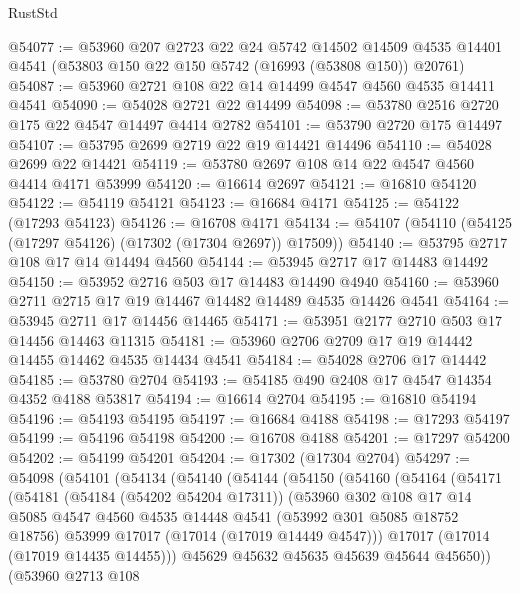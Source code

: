 \begin{lexlean}{RustStd}
\begin{coremodule}
{\begin{coremodule}
{{{{{{{{{{{{{{{{{{{{{{{{{{{{{{{{{{{{{{{{{{{{{{{{{{{{{{{@54077 := @53960
    @207
    @2723
    @22
    @24
    @5742
    @14502
    @14509
    @4535
    @14401
    @4541
    (@53803 @150 @22 @150 @5742 (@16993 (@53808 @150)) @20761)
@54087 := @53960 @2721 @108 @22 @14 @14499 @4547 @4560 @4535 @14411 @4541
@54090 := @54028 @2721 @22 @14499
@54098 := @53780 @2516 @2720 @175 @22 @4547 @14497 @4414 @2782
@54101 := @53790 @2720 @175 @14497
@54107 := @53795 @2699 @2719 @22 @19 @14421 @14496
@54110 := @54028 @2699 @22 @14421
@54119 := @53780 @2697 @108 @14 @22 @4547 @4560 @4414 @4171 @53999
@54120 := @16614 @2697
@54121 := @16810 @54120
@54122 := @54119 @54121
@54123 := @16684 @4171
@54125 := @54122 (@17293 @54123)
@54126 := @16708 @4171
@54134 := @54107 (@54110 (@54125 (@17297 @54126) (@17302 (@17304 @2697)) @17509))
@54140 := @53795 @2717 @108 @17 @14 @14494 @4560
@54144 := @53945 @2717 @17 @14483 @14492
@54150 := @53952 @2716 @503 @17 @14483 @14490 @4940
@54160 := @53960 @2711 @2715 @17 @19 @14467 @14482 @14489 @4535 @14426 @4541
@54164 := @53945 @2711 @17 @14456 @14465
@54171 := @53951 @2177 @2710 @503 @17 @14456 @14463 @11315
@54181 := @53960 @2706 @2709 @17 @19 @14442 @14455 @14462 @4535 @14434 @4541
@54184 := @54028 @2706 @17 @14442
@54185 := @53780 @2704
@54193 := @54185 @490 @2408 @17 @4547 @14354 @4352 @4188 @53817
@54194 := @16614 @2704
@54195 := @16810 @54194
@54196 := @54193 @54195
@54197 := @16684 @4188
@54198 := @17293 @54197
@54199 := @54196 @54198
@54200 := @16708 @4188
@54201 := @17297 @54200
@54202 := @54199 @54201
@54204 := @17302 (@17304 @2704)
@54297 := @54098
    (@54101
      (@54134
        (@54140
          (@54144
            (@54150
              (@54160
                (@54164
                  (@54171
                    (@54181
                      (@54184 (@54202 @54204 @17311))
                      (@53960
                        @302
                        @108
                        @17
                        @14
                        @5085
                        @4547
                        @4560
                        @4535
                        @14448
                        @4541
                        (@53992 @301 @5085 @18752 @18756)
                        @53999
                        @17017
                        (@17014 (@17019 @14449 @4547)))
                      @17017
                      (@17014 (@17019 @14435 @14455)))
                    @45629
                    @45632
                    @45635
                    @45639
                    @45644
                    @45650))
                (@53960
                  @2713
                  @108
}}}}}}}}}}}}}}}}}}}}}}}}}}}}}}}}}}}}}}}}}}}}}}}}}}}}}}}
\end{coremodule}}
\end{coremodule}
\end{lexlean}
